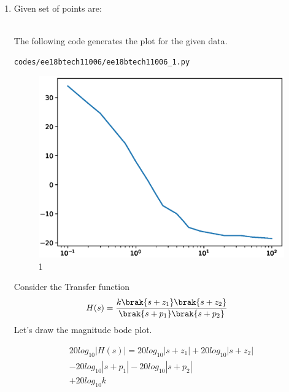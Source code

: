 \begin{enumerate}[label=\thesubsection.\arabic*.,ref=\thesubsection.\theenumi]

\item Given set of points are:
\begin{table}[!ht]
\centering

\caption{}
\label{table:ee18btech11006}
\end{table}\\
\solution 
The following code generates the plot for the given data.
\begin{lstlisting}
codes/ee18btech11006/ee18btech11006_1.py
\end{lstlisting}
\begin{figure}[!ht]
\centering
\includegraphics[width=\columnwidth]{./figs/ee18btech11006/ee18btech11006_1.eps}
\caption{1}
\label{fig:ee18btech11006_1}
\end{figure}
Consider the Transfer function
\begin{align}
H(s) &= \frac{k\brak{s+z_{1}}\brak{s+z_{2}}}{\brak{s+p_{1}}\brak{s+p_{2}}} 
\end{align}
Let's draw the magnitude bode plot.
\\
\solution 
\begin{enumerate}

\begin{multline}
20log_{10}|H(s)| = 20log_{10}|s+z_{1}|+20log_{10}|s+z_{2}|\\
-20log_{10}|s+p_{1}|-20log_{10}|s+p_{2}|\\
+20log_{10}k
\end{multline}


\end{enumerate}
\end{enumerate}
